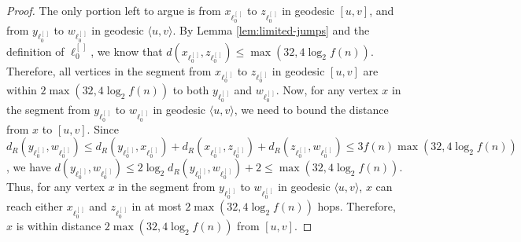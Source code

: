 \documentclass[11pt]{article}
\begin{document}
\begin{proof}
The only portion left to argue is from $x_{\ell_0^{[\,]}}$ to $z_{\ell_0^{[\,]}}$
	in geodesic $[u,v]$, and from $y_{\ell_0^{[\,]}}$ to $w_{\ell_0^{[\,]}}$ in
	geodesic $\langle u,v\rangle$.
By Lemma \ref{lem:limited-jumps} and the definition of $\ell_0^{[\,]}$, 
	we know that 
	$d(x_{\ell_0^{[\,]}}, z_{\ell_0^{[\,]}}) \le
	\max(32,4\log_2 f(n))$.
Therefore, all vertices in the segment from $x_{\ell_0^{[\,]}}$ to $z_{\ell_0^{[\,]}}$
	in geodesic $[u,v]$ are within $2\max(32,4\log_2 f(n))$ to
	both $y_{\ell_0^{[\,]}}$ and $w_{\ell_0^{[\,]}}$.
Now, for any vertex $x$ in the segment from $y_{\ell_0^{[\,]}}$ to $w_{\ell_0^{[\,]}}$ in
	geodesic $\langle u,v\rangle$, we need to bound the distance from 
	$x$ to $[u,v]$.
Since $d_R(y_{\ell_0^{[\,]}},w_{\ell_0^{[\,]}}) \le
	d_R(y_{\ell_0^{[\,]}},x_{\ell_0^{[\,]}}) + d_R(x_{\ell_0^{[\,]}},z_{\ell_0^{[\,]}}) + 
	d_R(z_{\ell_0^{[\,]}},w_{\ell_0^{[\,]}}) \le 3 f(n)\max(32,4\log_2 f(n))$,
	we have $d(y_{\ell_0^{[\,]}},w_{\ell_0^{[\,]}})  \le
	2\log_2d_R(y_{\ell_0^{[\,]}},w_{\ell_0^{[\,]}}) + 2\le \max(32,4\log_2 f(n))$.
Thus, for any vertex $x$  in the segment from $y_{\ell_0^{[\,]}}$ to 
	$w_{\ell_0^{[\,]}}$ in geodesic $\langle u,v\rangle$, $x$ can 
	reach either $x_{\ell_0^{[\,]}}$ and $z_{\ell_0^{[\,]}}$ in
	at most $2\max(32,4\log_2 f(n))$
	hops.
Therefore, $x$ is within distance $2\max(32,4\log_2 f(n))$ from $[u,v]$.
\end{proof}
\end{document}

